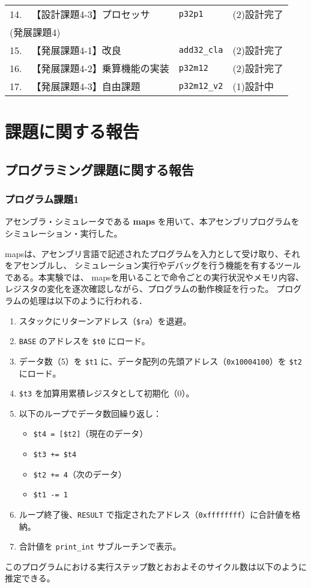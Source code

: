 \documentclass[autodetect-engine,dvi=dvipdfmx,ja=standard,
               a4j,11pt]{bxjsarticle}
\begin{document}
\begin{table}[b]
\begin{center}
{\begin{tabular}{rll|l}
    14. & 【設計課題4-3】プロセッサ      & \verb|p32p1|          & (2)設計完了 \\
    \multicolumn{3}{l|}{(発展課題4)} & \\
    15. & 【発展課題4-1】改良            & \verb|add32_cla|      & (2)設計完了 \\
    16. & 【発展課題4-2】乗算機能の実装  &  \verb|p32m12|         & (2)設計完了 \\
    17. & 【発展課題4-3】自由課題        &  \verb|p32m12_v2|      & (1)設計中 \\
    \hline
    \end{tabular}
    }
    \end{center}
    \end{table}
    \clearpage
\section{課題に関する報告}
\subsection{プログラミング課題に関する報告}
\subsubsection*{プログラム課題1}
アセンブラ・シミュレータである \textbf{maps} を用いて、本アセンブリプログラムをシミュレーション・実行した。

mapsは、アセンブリ言語で記述されたプログラムを入力として受け取り、それをアセンブルし、
シミュレーション実行やデバッグを行う機能を有するツールである。本実験では、
mapsを用いることで命令ごとの実行状況やメモリ内容、レジスタの変化を逐次確認しながら、プログラムの動作検証を行った。
プログラムの処理は以下のように行われる．
\begin{enumerate}
  \item スタックにリターンアドレス（\texttt{\$ra}）を退避。
  \item \texttt{BASE} のアドレスを \texttt{\$t0} にロード。
  \item データ数（5）を \texttt{\$t1} に、データ配列の先頭アドレス（\texttt{0x10004100}）を \texttt{\$t2} にロード。
  \item \texttt{\$t3} を加算用累積レジスタとして初期化（0）。
  \item 以下のループでデータ数回繰り返し：
  \begin{itemize}
    \item \texttt{\$t4 = [\$t2]}（現在のデータ）
    \item \texttt{\$t3 += \$t4}
    \item \texttt{\$t2 += 4}（次のデータ）
    \item \texttt{\$t1 -= 1}
  \end{itemize}
  \item ループ終了後、\texttt{RESULT} で指定されたアドレス（\texttt{0xffffffff}）に合計値を格納。
  \item 合計値を \texttt{print\_int} サブルーチンで表示。
\end{enumerate}
このプログラムにおける実行ステップ数とおおよそのサイクル数は以下のように推定できる。
\end{document}

